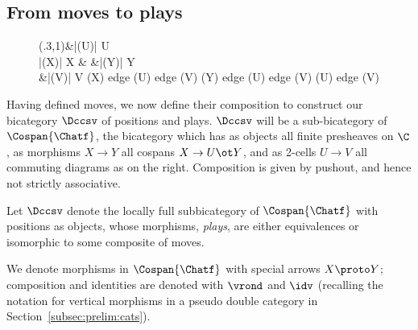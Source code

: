 \documentclass{LMCS}
\theoremstyle{plain}\newtheorem{satz}[thm]{Satz}
\begin{document}
\subsection{From moves to plays}\label{subsec:plays}
\begin{wrapfigure}[5]{r}{0pt}
  \begin{minipage}[c]{0.25\linewidth}
    \vspace*{-1.5em}
    \diag(.3,1){\&|(U)| U \\
      |(X)| X \& \&|(Y)| Y \\
      \&|(V)| V }{(X) edge (U) edge (V) (Y) edge (U) edge (V) (U) edge (V) }
  \end{minipage}
\end{wrapfigure}
Having defined moves, we now define their composition to construct our
bicategory $\Dccsv$ of positions and plays.  $\Dccsv$ will be a
sub-bicategory of $\Cospan{\Chatf}$, the bicategory which has as
objects all finite presheaves on $\C$, as morphisms $X \to Y$ all
cospans $X \to U \ot Y$, and as 2-cells $U \to V$ all commuting
diagrams as on the right.  Composition is given by pushout, and hence
not strictly associative. 



\begin{defi}
  Let $\Dccsv$ denote the locally full subbicategory of
  $\Cospan{\Chatf}$ with positions as objects, whose morphisms,
  \emph{plays}, are either equivalences or isomorphic to some
  composite of moves. 
\end{defi}
We denote morphisms in $\Cospan{\Chatf}$ with special arrows $X \proto
Y$; composition and identities are denoted with $\vrond$ and $\idv$
(recalling the notation for vertical morphisms in a pseudo double
category in Section~\ref{subsec:prelim:cats}).
\end{document}
